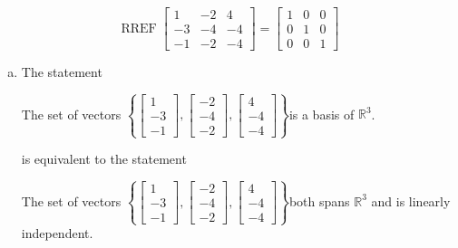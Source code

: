 \begin{exerciseAnswer} 


\[\operatorname{RREF} \left[\begin{array}{ccc}
1 & -2 & 4 \\
-3 & -4 & -4 \\
-1 & -2 & -4
\end{array}\right] = \left[\begin{array}{ccc}
1 & 0 & 0 \\
0 & 1 & 0 \\
0 & 0 & 1
\end{array}\right] \]


\begin{enumerate}[(a)]
\item The statement 
\begin{center}\begin{minipage}{0.8\textwidth}
 The set of vectors \( \left\{ \left[\begin{array}{c}
1 \\
-3 \\
-1
\end{array}\right] , \left[\begin{array}{c}
-2 \\
-4 \\
-2
\end{array}\right] , \left[\begin{array}{c}
4 \\
-4 \\
-4
\end{array}\right] \right\} \)is a basis of \(\mathbb{R}^3\). 
\end{minipage}\end{center}
     is equivalent to the statement 
\begin{center}\begin{minipage}{0.8\textwidth}
 The set of vectors \( \left\{ \left[\begin{array}{c}
1 \\
-3 \\
-1
\end{array}\right] , \left[\begin{array}{c}
-2 \\
-4 \\
-2
\end{array}\right] , \left[\begin{array}{c}
4 \\
-4 \\
-4
\end{array}\right] \right\} \)both spans \(\mathbb{R}^3\) and is linearly independent.
\end{minipage}\end{center}
    

\end{enumerate}
\end{exerciseAnswer}
